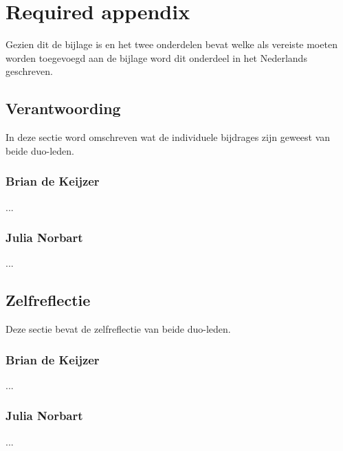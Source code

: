 \chapter{Required appendix}
    Gezien dit de bijlage is en het twee onderdelen bevat welke als vereiste moeten worden toegevoegd aan de bijlage word dit onderdeel in het Nederlands geschreven.
    
\section{Verantwoording}
In deze sectie word omschreven wat de individuele bijdrages zijn geweest van beide duo-leden.
    \subsection{Brian de Keijzer}
    ...
    \subsection{Julia Norbart}
    ...

\section{Zelfreflectie}
Deze sectie bevat de zelfreflectie van beide duo-leden.
    \subsection{Brian de Keijzer}
    ...
    \subsection{Julia Norbart}
    ...